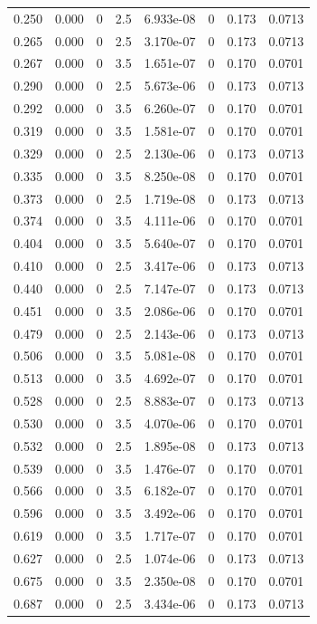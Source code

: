 \documentclass[preview]{standalone}
\begin{document}
{{\begin{tabular}{L{1.2cm}C{1.2cm} C{0.3cm}C{0.5cm} C{1.4cm}C{1.4cm} C{1.4cm}C{1.4cm}}
  0.250  &  0.000  & 0     & 2.5 &  6.933e-08  & 0  & 0.173 &  0.0713   \\ 
  0.265  &  0.000  & 0     & 2.5 &  3.170e-07  & 0  & 0.173 &  0.0713   \\ 
  0.267  &  0.000  & 0     & 3.5 &  1.651e-07  & 0  & 0.170 &  0.0701   \\ 
  0.290  &  0.000  & 0     & 2.5 &  5.673e-06  & 0  & 0.173 &  0.0713   \\ 
  0.292  &  0.000  & 0     & 3.5 &  6.260e-07  & 0  & 0.170 &  0.0701   \\ 
  0.319  &  0.000  & 0     & 3.5 &  1.581e-07  & 0  & 0.170 &  0.0701   \\ 
  0.329  &  0.000  & 0     & 2.5 &  2.130e-06  & 0  & 0.173 &  0.0713   \\ 
  0.335  &  0.000  & 0     & 3.5 &  8.250e-08  & 0  & 0.170 &  0.0701   \\ 
  0.373  &  0.000  & 0     & 2.5 &  1.719e-08  & 0  & 0.173 &  0.0713   \\ 
  0.374  &  0.000  & 0     & 3.5 &  4.111e-06  & 0  & 0.170 &  0.0701   \\ 
  0.404  &  0.000  & 0     & 3.5 &  5.640e-07  & 0  & 0.170 &  0.0701   \\ 
  0.410  &  0.000  & 0     & 2.5 &  3.417e-06  & 0  & 0.173 &  0.0713   \\ 
  0.440  &  0.000  & 0     & 2.5 &  7.147e-07  & 0  & 0.173 &  0.0713   \\ 
  0.451  &  0.000  & 0     & 3.5 &  2.086e-06  & 0  & 0.170 &  0.0701   \\ 
  0.479  &  0.000  & 0     & 2.5 &  2.143e-06  & 0  & 0.173 &  0.0713   \\ 
  0.506  &  0.000  & 0     & 3.5 &  5.081e-08  & 0  & 0.170 &  0.0701   \\ 
  0.513  &  0.000  & 0     & 3.5 &  4.692e-07  & 0  & 0.170 &  0.0701   \\ 
  0.528  &  0.000  & 0     & 2.5 &  8.883e-07  & 0  & 0.173 &  0.0713   \\ 
  0.530  &  0.000  & 0     & 3.5 &  4.070e-06  & 0  & 0.170 &  0.0701   \\ 
  0.532  &  0.000  & 0     & 2.5 &  1.895e-08  & 0  & 0.173 &  0.0713   \\ 
  0.539  &  0.000  & 0     & 3.5 &  1.476e-07  & 0  & 0.170 &  0.0701   \\ 
  0.566  &  0.000  & 0     & 3.5 &  6.182e-07  & 0  & 0.170 &  0.0701   \\ 
  0.596  &  0.000  & 0     & 3.5 &  3.492e-06  & 0  & 0.170 &  0.0701   \\ 
  0.619  &  0.000  & 0     & 3.5 &  1.717e-07  & 0  & 0.170 &  0.0701   \\ 
  0.627  &  0.000  & 0     & 2.5 &  1.074e-06  & 0  & 0.173 &  0.0713   \\ 
  0.675  &  0.000  & 0     & 3.5 &  2.350e-08  & 0  & 0.170 &  0.0701   \\ 
  0.687  &  0.000  & 0     & 2.5 &  3.434e-06  & 0  & 0.173 &  0.0713   \\ 
\hline 
\end{tabular} 

}}
\end{document}
